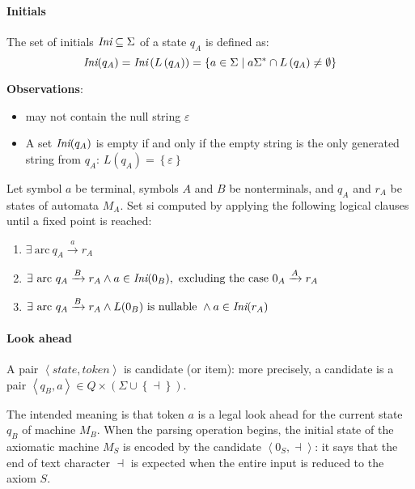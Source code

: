 \documentclass[english]{article}
\begin{document}
\paragraph{Initials}

The set of initials \(\textit{Ini} \subseteq \Sigma\) of a state \(q_A\) is defined as:
\[ \textit{Ini}(q_A) = \textit{Ini}\left( L\left( q_A \right) \right) = \left\{ a \in \Sigma \mid a \Sigma^\ast \cap L\left( q_A \right) \neq \emptyset \right\} \]

\bigskip
\textbf{Observations}:
\begin{itemize}
  \item \Ini may not contain the null string \(\varepsilon\)
  \item A set \(\textit{Ini}(q_A)\) is empty if and only if the empty string is the only generated string from \(q_A\): \(L\left( q_A \right) = \left\{ \varepsilon \right\}\)
\end{itemize}

\bigskip
Let symbol \(a\) be terminal, symbols \(A\) and \(B\) be nonterminals, and \(q_A\) and \(r_A\) be states of automata \(M_A\).
Set \Ini si computed by applying the following logical clauses until a fixed point is reached:

\begin{enumerate}
  \item \(\exists \ \text{arc} \ q_A \xrightarrow{a} r_A\)
  \item \(\exists \ \text{arc} \ q_A \xrightarrow{B} r_A \land a \in \Ini(0_B), \ \text{excluding the case} \ 0_A \xrightarrow{A} r_A\)
  \item \(\exists \ \text{arc} \ q_A \xrightarrow{B} r_A \land L(0_B) \ \text{is nullable} \ \land a \in \textit{Ini}(r_A)\)
\end{enumerate}

\paragraph{Look ahead}

A pair \(\left\langle \textit{state}, \textit{token} \right\rangle\) is candidate (or item):
more precisely, a candidate is a pair \(\left\langle q_B, a \right\rangle \in Q \times \left( \Sigma \cup \left\{ \dashv \right\} \right)\).

The intended meaning is that token \(a\) is a legal look ahead for the current state \(q_B\) of machine \(M_B\).
When the parsing operation begins, the initial state of the axiomatic machine \(M_S\) is encoded by the candidate \(\left\langle 0_S, \dashv \right\rangle\):
it says that the end of text character \(\dashv\) is expected when the entire input is reduced to the axiom \(S\).
\end{document}
